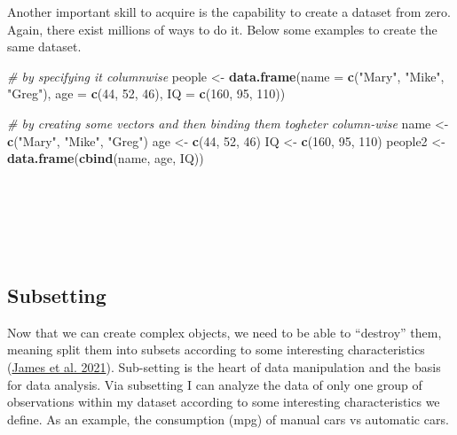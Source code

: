 \documentclass[
]{article}
\newenvironment{Shaded}{\begin{snugshade}}{\end{snugshade}}
\newcommand{\AttributeTok}[1]{\textcolor[rgb]{0.13,0.29,0.53}{#1}}
\newcommand{\CommentTok}[1]{\textcolor[rgb]{0.56,0.35,0.01}{\textit{#1}}}
\newcommand{\DecValTok}[1]{\textcolor[rgb]{0.00,0.00,0.81}{#1}}
\newcommand{\FunctionTok}[1]{\textcolor[rgb]{0.13,0.29,0.53}{\textbf{#1}}}
\newcommand{\NormalTok}[1]{#1}
\newcommand{\OtherTok}[1]{\textcolor[rgb]{0.56,0.35,0.01}{#1}}
\newcommand{\StringTok}[1]{\textcolor[rgb]{0.31,0.60,0.02}{#1}}
\begin{document}
Another important skill to acquire is the capability to create a dataset
from zero. Again, there exist millions of ways to do it. Below some
examples to create the same dataset.

\begin{Shaded}
\begin{Highlighting}[]
\CommentTok{\# by specifying it columnwise}
\NormalTok{people }\OtherTok{\textless{}{-}} \FunctionTok{data.frame}\NormalTok{(}\AttributeTok{name =} \FunctionTok{c}\NormalTok{(}\StringTok{"Mary"}\NormalTok{, }\StringTok{"Mike"}\NormalTok{, }\StringTok{"Greg"}\NormalTok{),}
                     \AttributeTok{age =} \FunctionTok{c}\NormalTok{(}\DecValTok{44}\NormalTok{, }\DecValTok{52}\NormalTok{, }\DecValTok{46}\NormalTok{),}
                     \AttributeTok{IQ =} \FunctionTok{c}\NormalTok{(}\DecValTok{160}\NormalTok{, }\DecValTok{95}\NormalTok{, }\DecValTok{110}\NormalTok{))}

\CommentTok{\# by creating some vectors and then binding them togheter column{-}wise}
\NormalTok{name }\OtherTok{\textless{}{-}} \FunctionTok{c}\NormalTok{(}\StringTok{"Mary"}\NormalTok{, }\StringTok{"Mike"}\NormalTok{, }\StringTok{"Greg"}\NormalTok{)}
\NormalTok{age }\OtherTok{\textless{}{-}} \FunctionTok{c}\NormalTok{(}\DecValTok{44}\NormalTok{, }\DecValTok{52}\NormalTok{, }\DecValTok{46}\NormalTok{)}
\NormalTok{IQ }\OtherTok{\textless{}{-}} \FunctionTok{c}\NormalTok{(}\DecValTok{160}\NormalTok{, }\DecValTok{95}\NormalTok{, }\DecValTok{110}\NormalTok{)}
\NormalTok{people2 }\OtherTok{\textless{}{-}} \FunctionTok{data.frame}\NormalTok{(}\FunctionTok{cbind}\NormalTok{(name, age, IQ))}
\end{Highlighting}
\end{Shaded}

~

~

~

\hypertarget{subsetting}{%
\subsection{Subsetting}\label{subsetting}}

Now that we can create complex objects, we need to be able to ``destroy''
them, meaning split them into subsets according to some interesting
characteristics (\protect\hyperlink{ref-james2021}{James et al. 2021}). Sub-setting is the heart of data
manipulation and the basis for data analysis. Via subsetting I can
analyze the data of only one group of observations within my dataset
according to some interesting characteristics we define. As an example,
the consumption (mpg) of manual cars vs automatic cars.
\end{document}
